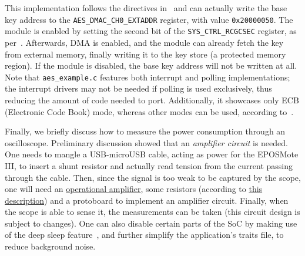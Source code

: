 \documentclass{../sftex/sftex}
\begin{document}
This implementation follows the directives in~\cite[Sec.
22.2.5.4.2.1]{Texas:report:2013:may} and can actually write the base key
address to the \verb!AES_DMAC_CH0_EXTADDR! register, with value
\verb!0x20000050!. The module is enabled by setting the second bit of the
\verb!SYS_CTRL_RCGCSEC! register, as per~\cite[Sec. 7.7.12, pp.
207]{Texas:report:2013:may}. Afterwards, DMA is enabled, and the module can
already fetch the key from external memory, finally writing it to the key store
(a protected memory region). If the module is disabled, the base key address
will not be written at all. Note that \verb!aes_example.c! features both
interrupt and polling implementations; the interrupt drivers may not be needed
if polling is used exclusively, thus reducing the amount of code needed to
port. Additionally, it showcases only ECB (Electronic Code Book) mode, whereas
other modes can be used, according to~\cite[Sec.
22.2.1.1.3]{Texas:report:2013:may}.

Finally, we briefly discuss how to measure the power consumption through an
oscilloscope. Preliminary discussion showed that an \emph{amplifier circuit} is
needed. One needs to mangle a USB-microUSB cable, acting as power for the
EPOSMote III, to insert a shunt resistor and actually read tension from the
current passing through the cable. Then, since the signal is too weak to be
captured by the scope, one will need an
\href{http://www.ti.com/product/TL074}{operational amplifier}, some resistors
(according to \href{http://epos.lisha.ufsc.br/dl675?display}{this description})
and a protoboard to implement an amplifier circuit. Finally, when the scope is
able to sense it, the measurements can be taken (this circuit design is subject
to changes). One can also disable certain parts of the SoC by making use of the
deep sleep feature~\cite[Sec. 3.5.1, pp. 132]{Texas:report:2013:may}, and
further simplify the application's traits file, to reduce background noise.



\end{document}
